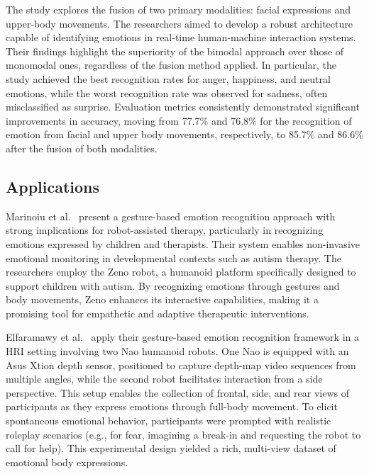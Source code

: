 The study explores the fusion of two primary modalities: facial expressions and upper-body movements. The researchers aimed to develop a robust architecture capable of identifying emotions in real-time human-machine interaction systems. Their findings highlight the superiority of the bimodal approach over those of monomodal ones, regardless of the fusion method applied. In particular, the study achieved the best recognition rates for anger, happiness, and neutral emotions, while the worst recognition rate was observed for sadness, often misclassified as surprise. Evaluation metrics consistently demonstrated significant improvements in accuracy, moving from 77.7\% and 76.8\% for the recognition of emotion from facial and upper body movements, respectively, to 85.7\% and 86.6\% after the fusion of both modalities.

\subsection{Applications}
Marinoiu et al.\ \cite{8578328} present a gesture-based emotion recognition approach with strong implications for robot-assisted therapy, particularly in recognizing emotions expressed by children and therapists. Their system enables non-invasive emotional monitoring in developmental contexts such as autism therapy. The researchers employ the Zeno robot, a humanoid platform specifically designed to support children with autism. By recognizing emotions through gestures and body movements, Zeno enhances its interactive capabilities, making it a promising tool for empathetic and adaptive therapeutic interventions.

Elfaramawy et al.\ \cite{Elfaramawy2017-ab} apply their gesture-based emotion recognition framework in a HRI setting involving two Nao humanoid robots. One Nao is equipped with an Asus Xtion depth sensor, positioned to capture depth-map video sequences from multiple angles, while the second robot facilitates interaction from a side perspective. This setup enables the collection of frontal, side, and rear views of participants as they express emotions through full-body movement. To elicit spontaneous emotional behavior, participants were prompted with realistic roleplay scenarios (e.g., for fear, imagining a break-in and requesting the robot to call for help). This experimental design yielded a rich, multi-view dataset of emotional body expressions.

